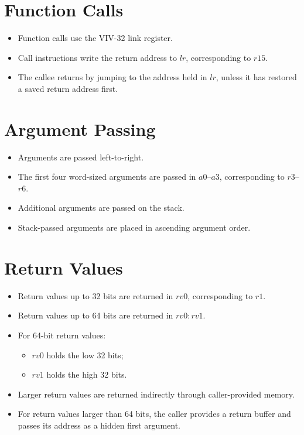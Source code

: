 \section{Function Calls}

\begin{itemize}
  \item Function calls use the VIV-32 link register.
  \item Call instructions write the return address to \(lr\), corresponding to \(r15\).
  \item The callee returns by jumping to the address held in \(lr\), unless it has restored a saved return address first.
\end{itemize}

\section{Argument Passing}

\begin{itemize}
  \item Arguments are passed left-to-right.
  \item The first four word-sized arguments are passed in \(a0\)--\(a3\), corresponding to \(r3\)--\(r6\).
  \item Additional arguments are passed on the stack.
  \item Stack-passed arguments are placed in ascending argument order.
\end{itemize}

\section{Return Values}

\begin{itemize}
  \item Return values up to 32 bits are returned in \(rv0\), corresponding to \(r1\).
  \item Return values up to 64 bits are returned in \(rv0:rv1\).
  \item For 64-bit return values:
  \begin{itemize}
    \item \(rv0\) holds the low 32 bits;
    \item \(rv1\) holds the high 32 bits.
  \end{itemize}
  \item Larger return values are returned indirectly through caller-provided memory.
  \item For return values larger than 64 bits, the caller provides a return buffer and passes its address as a hidden first argument.
\end{itemize}


